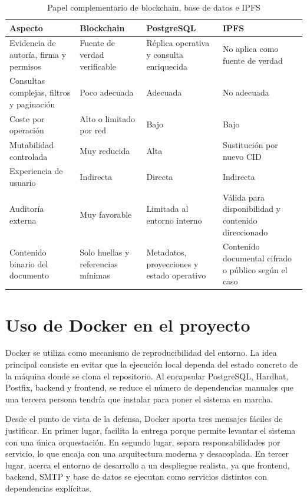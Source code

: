 \documentclass[11pt, a4paper]{article}
\begin{document}
\begin{table}[H]
    \centering
    \small
    \begin{tabular}{|p{3.8cm}|p{3.6cm}|p{3.6cm}|p{3.6cm}|}
    \hline
    \textbf{Aspecto} & \textbf{Blockchain} & \textbf{PostgreSQL} & \textbf{IPFS} \\
    \hline
    Evidencia de autoría, firma y permisos & Fuente de verdad verificable & Réplica operativa y consulta enriquecida & No aplica como fuente de verdad \\
    \hline
    Consultas complejas, filtros y paginación & Poco adecuada & Adecuada & No adecuada \\
    \hline
    Coste por operación & Alto o limitado por red & Bajo & Bajo \\
    \hline
    Mutabilidad controlada & Muy reducida & Alta & Sustitución por nuevo CID \\
    \hline
    Experiencia de usuario & Indirecta & Directa & Indirecta \\
    \hline
    Auditoría externa & Muy favorable & Limitada al entorno interno & Válida para disponibilidad y contenido direccionado \\
    \hline
    Contenido binario del documento & Solo huellas y referencias mínimas & Metadatos, proyecciones y estado operativo & Contenido documental cifrado o público según el caso \\
    \hline
    \end{tabular}
    \caption{Papel complementario de blockchain, base de datos e IPFS}
    \label{tab:blockchain-bd}
\end{table}

\section{Uso de Docker en el proyecto}

Docker se utiliza como mecanismo de reproducibilidad del entorno. La idea principal consiste en evitar que la ejecución local dependa del estado concreto de la máquina donde se clona el repositorio. Al encapsular PostgreSQL, Hardhat, Postfix, backend y frontend, se reduce el número de dependencias manuales que una tercera persona tendría que instalar para poner el sistema en marcha.

Desde el punto de vista de la defensa, Docker aporta tres mensajes fáciles de justificar. En primer lugar, facilita la entrega porque permite levantar el sistema con una única orquestación. En segundo lugar, separa responsabilidades por servicio, lo que encaja con una arquitectura moderna y desacoplada. En tercer lugar, acerca el entorno de desarrollo a un despliegue realista, ya que frontend, backend, SMTP y base de datos se ejecutan como servicios distintos con dependencias explícitas.
\end{document}
